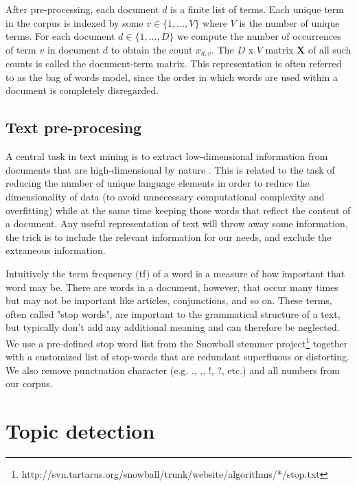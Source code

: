 \documentclass[12pt,a4paper,notitlepage]{article}
\begin{document}
After pre-processing, each document $d$ is a finite list of terms. Each unique term in the corpus is indexed by some $v \in \lbrace 1,...,V \rbrace$ where $V$ is the number of unique terms. For each document $d \in \lbrace 1,...,D \rbrace$ we compute the number of occurrences of term $v$ in document $d$ to obtain the count $x_{d,v}$. The $D$ x $V$ matrix $\boldsymbol{X}$ of all such counts is called the document-term matrix. This representation is often referred to as the bag of words model, since the order in which words are used within a document is completely disregarded. 


\subsection{Text pre-procesing}

A central task in text mining is to extract low-dimensional information from documents that are high-dimensional by nature \citep{bholat_text_2015}. This is related to the task of reducing the number of unique language elements in order to reduce the dimensionality of data (to avoid unnecessary computational complexity and overfitting) while at the same time keeping those words that reflect the content of a document. Any useful representation of text will throw away some information, the trick is to include the relevant information for our needs, and exclude the extraneous information. 

Intuitively the term frequency (tf) of a word is a measure of how important that word may be. There are words in a document, however, that occur many times but may not be important like articles, conjunctions, and so on. These terms, often called "stop words", are important to the grammatical structure of a text, but typically don't add any additional meaning and can therefore be neglected. We use a pre-defined stop word list from the Snowball stemmer project\footnote{http://svn.tartarus.org/snowball/trunk/website/algorithms/*/stop.txt} together with a customized list of stop-words that are redundant superfluous or distorting. We also remove punctuation character (e.g. ., ,, !, ?, etc.) and all numbers from our corpus.  

\section{Topic detection}\label{ch_model}
\end{document}

